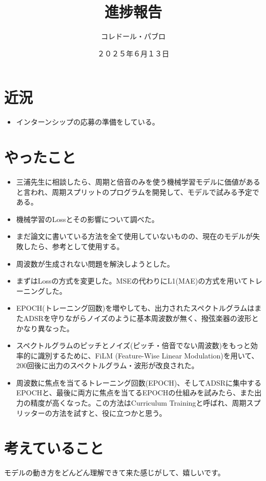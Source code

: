 \documentclass[a4paper, 12pt]{article}
\title{進捗報告}
\author{コレドール・パブロ}
\date{２０２５年６月１３日}
\begin{document}
\maketitle

\section*{近況}
\begin{itemize}
    \item インターンシップの応募の準備をしている。
\end{itemize} 

\section*{やったこと}
\begin{itemize}
    \item 三浦先生に相談したら、周期と倍音のみを使う機械学習モデルに価値があると言われ、周期スプリットのプログラムを開発して、モデルで試みる予定である。
    \item 機械学習のLossとその影響について調べた。\cite{2024survey}
    \item まだ論文に書いている方法を全て使用していないものの、現在のモデルが失敗したら、参考として使用する。
    \item 周波数が生成されない問題を解決しようとした。
    \item まずはLossの方式を変更した。MSEの代わりにL1(MAE)の方式を用いてトレーニングした。
    \item EPOCH(トレーニング回数)を増やしても、出力されたスペクトルグラムはまたADSRを守りながらノイズのように基本周波数が無く、撥弦楽器の波形とかなり異なった。
    \item スペクトルグラムのピッチとノイズ(ピッチ・倍音でない周波数)をもっと効率的に識別するために、FiLM (Feature-Wise Linear Modulation)を用いて、200回後に出力のスペクトルグラム・波形が改良された。
    \item 周波数に焦点を当てるトレーニング回数(EPOCH)、そしてADSRに集中するEPOCHと、最後に両方に焦点を当てるEPOCHの仕組みを試みたら、また出力の精度が高くなった。この方法はCurriculum Trainingと呼ばれ、周期スプリッターの方法を試すと、役に立つかと思う。
\end{itemize}

\section*{考えていること}

モデルの動き方をどんどん理解できて来た感じがして、嬉しいです。
\end{document}
